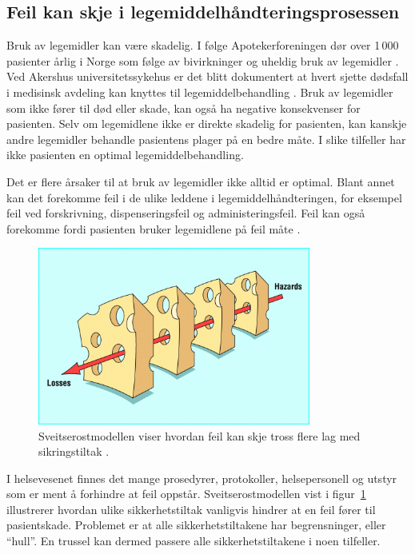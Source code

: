 \subsection*{Feil kan skje i legemiddelhåndteringsprosessen}
Bruk av legemidler kan være skadelig. I følge Apotekerforeningen dør over 1\,000 pasienter årlig i Norge som følge av bivirkninger og uheldig bruk av legemidler \citep{ApotekINorge}. Ved Akershus universitetssykehus er det blitt dokumentert at hvert sjette dødsfall i medisinsk avdeling kan knyttes til legemiddelbehandling \citep{JOIM:JOIM892}. Bruk av legemidler som ikke fører til død eller skade, kan også ha negative konsekvenser for pasienten. Selv om legemidlene ikke er direkte skadelig for pasienten, kan kanskje andre legemidler behandle pasientens plager på en bedre måte. I slike tilfeller har ikke pasienten en optimal legemiddelbehandling.

Det er flere årsaker til at bruk av legemidler ikke alltid er optimal. Blant annet kan det forekomme feil i de ulike leddene i legemiddelhåndteringen, for eksempel feil ved forskrivning, dispenseringsfeil og administeringsfeil. Feil kan også forekomme fordi pasienten bruker legemidlene på feil måte \citep{Sosial-OgHelsedirektoratet, IllustrertFarmakologi}.

\begin{figure}[H]
    \centering
    \includegraphics[width=0.8\textwidth]{fig/innledning/sveitserost.jpg}
    \caption{Sveitserostmodellen viser hvordan feil kan skje tross flere lag med sikringstiltak     \citep{HumanErrorModelsManagement}.}
    \label{fig:sveitserost}
\end{figure}

I helsevesenet finnes det mange prosedyrer, protokoller, helsepersonell og utstyr som er ment å forhindre at feil oppstår. Sveitserostmodellen \citep{HumanErrorModelsManagement} vist i figur~\ref{fig:sveitserost} illustrerer hvordan ulike sikkerhetstiltak vanligvis hindrer at en feil fører til pasientskade. Problemet er at alle sikkerhetstiltakene har begrensninger, eller “hull”. En trussel kan dermed passere alle sikkerhetstiltakene i noen tilfeller.  

